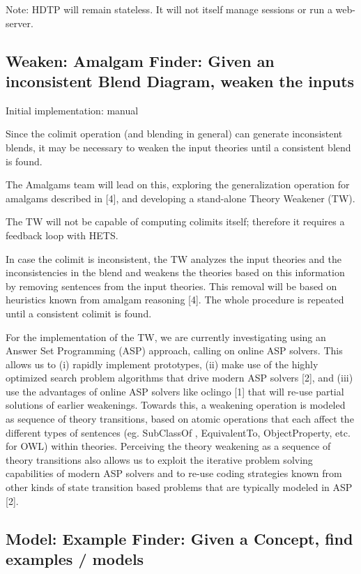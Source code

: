 \documentclass[10pt]{article}
\begin{document}
Note: HDTP will remain stateless. It will not itself manage sessions or run a web-server.
\subsection{Weaken: Amalgam Finder: Given an inconsistent Blend Diagram, weaken the inputs}


Initial implementation: manual

Since the colimit operation (and blending in general) can generate inconsistent blends, it may be necessary to weaken the input theories until a consistent blend is found. 

The Amalgams team will lead on this, exploring the generalization operation for amalgams described in [4], and developing a stand-alone Theory Weakener (TW).

The TW will not be capable of computing colimits itself; therefore it requires a feedback loop with HETS.

In case the colimit is inconsistent, the TW analyzes the input theories and the inconsistencies
in the blend and weakens the theories based on this information by removing sentences from the
input theories. This removal will be based on heuristics known from amalgam reasoning [4]. The whole procedure is repeated until a consistent colimit is found.

For the implementation of the TW, we are currently investigating using an 
Answer Set Programming (ASP) approach, calling on online ASP solvers. This allows us to (i) rapidly implement prototypes, 
(ii) make use of the highly optimized search problem algorithms that drive modern ASP solvers [2], and (iii) use the advantages of online ASP solvers like oclingo [1] that will re-use partial solutions of earlier weakenings. Towards this, a weakening operation is modeled as sequence of theory transitions, based on atomic operations that each affect the different types of sentences (eg. SubClassOf , EquivalentTo, ObjectProperty, etc. for OWL) within theories. Perceiving the theory weakening as a sequence of theory transitions also allows us to exploit the iterative problem solving capabilities of modern ASP solvers and to re-use coding strategies known from other kinds
of state transition based problems that are typically modeled in ASP [2].

\subsection{Model: Example Finder: Given a Concept, find examples / models}
\end{document}
